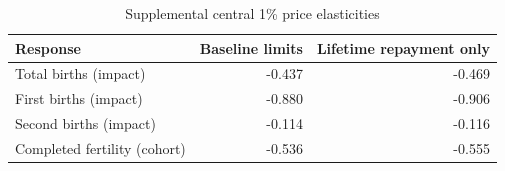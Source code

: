 \begin{table}[!htbp]
\centering
\caption{Supplemental central 1\% price elasticities}
\label{tab:recovery-price-elasticities}
\begin{tabular}{lrr}
\toprule
Response & Baseline limits & Lifetime repayment only \\
\midrule
Total births (impact) & -0.437 & -0.469 \\
First births (impact) & -0.880 & -0.906 \\
Second births (impact) & -0.114 & -0.116 \\
Completed fertility (cohort) & -0.536 & -0.555 \\
\bottomrule
\end{tabular}
\par{}
\end{table}
